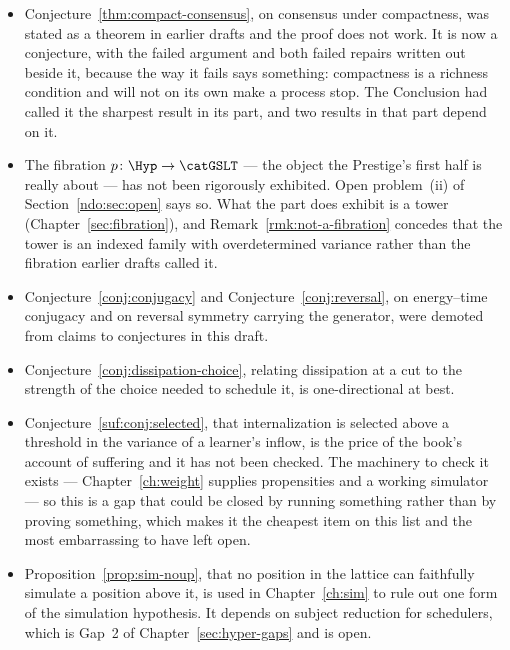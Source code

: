 \begin{itemize}[leftmargin=1.6em, itemsep=4pt]
\item Conjecture~\ref{thm:compact-consensus}, on consensus under
      compactness, was stated as a theorem in earlier drafts and the
      proof does not work.
      It is now a conjecture, with the failed argument and both
      failed repairs written out beside it, because the way it fails
      says something: compactness is a richness condition and will
      not on its own make a process stop.
      The Conclusion had called it the sharpest result in its part,
      and two results in that part depend on it.
\item The fibration $p\colon\Hyp\to\catGSLT$ --- the object the
      Prestige's first half is really about --- has not been
      rigorously exhibited.
      Open problem~(ii) of Section~\ref{ndo:sec:open} says so.
      What the part does exhibit is a tower
      (Chapter~\ref{sec:fibration}), and
      Remark~\ref{rmk:not-a-fibration} concedes that the tower is an
      indexed family with overdetermined variance rather than the
      fibration earlier drafts called it.
\item Conjecture~\ref{conj:conjugacy} and
      Conjecture~\ref{conj:reversal}, on energy--time conjugacy
      and on reversal symmetry carrying the generator, were
      demoted from claims to conjectures in this draft.
\item Conjecture~\ref{conj:dissipation-choice}, relating
      dissipation at a cut to the strength of the choice needed to
      schedule it, is one-directional at best.
\item Conjecture~\ref{suf:conj:selected}, that internalization is
      selected above a threshold in the variance of a learner's
      inflow, is the price of the book's account of suffering and it
      has not been checked.
      The machinery to check it exists --- Chapter~\ref{ch:weight}
      supplies propensities and a working simulator --- so this is a
      gap that could be closed by running something rather than by
      proving something, which makes it the cheapest item on this
      list and the most embarrassing to have left open.
\item Proposition~\ref{prop:sim-noup}, that no position in the
      lattice can faithfully simulate a position above it, is used in
      Chapter~\ref{ch:sim} to rule out one form of the simulation
      hypothesis.
      It depends on subject reduction for schedulers, which is
      Gap~2 of Chapter~\ref{sec:hyper-gaps} and is open.

\end{itemize}
